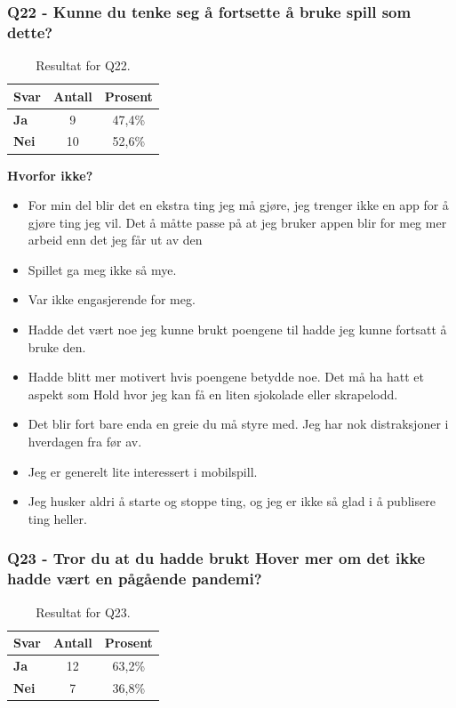 \subsubsection*{Q22 - Kunne du tenke seg å fortsette å bruke spill som dette?}
 \begin{table}[H]
    \centering
    \begin{tabularx}{0.4\textwidth}{|>{\bfseries}X|c|c|}
        \hline         \textbf{Svar}  & \textbf{Antall} & \textbf{Prosent}  \\  \hline
        Ja & 9 & 47,4\%  \\ 
        Nei & 10 & 52,6\% \\
         \hline
    \end{tabularx}
    \caption{Resultat for Q22.}
\end{table}

\textbf{Hvorfor ikke?} 
\begin{itemize}[noitemsep]
	\item For min del blir det en ekstra ting jeg må gjøre, jeg trenger ikke en app for å gjøre ting jeg vil. Det å måtte passe på at jeg bruker appen blir for meg mer arbeid enn det jeg får ut av den 
	\item Spillet ga meg ikke så mye.
	\item Var ikke engasjerende for meg.
	\item Hadde det vært noe jeg kunne brukt poengene til hadde jeg kunne fortsatt å bruke den.
	\item Hadde blitt mer motivert hvis poengene betydde noe. Det må ha hatt et aspekt som Hold hvor jeg kan få en liten sjokolade eller skrapelodd.
	\item Det blir fort bare enda en greie du må styre med. Jeg har nok distraksjoner i hverdagen fra før av.
	\item Jeg er generelt lite interessert i mobilspill.
	\item Jeg husker aldri å starte og stoppe ting, og jeg er ikke så glad i å publisere ting heller.
\end{itemize}

\subsubsection*{Q23 - Tror du at du hadde brukt Hover mer om det ikke hadde vært en pågående pandemi?}
 \begin{table}[H]
    \centering
    \begin{tabularx}{0.4\textwidth}{|>{\bfseries}X|c|c|}
        \hline         \textbf{Svar}  & \textbf{Antall} & \textbf{Prosent}  \\  \hline
        Ja & 12 & 63,2\%  \\ 
        Nei & 7 & 36,8\% \\
         \hline
    \end{tabularx}
    \caption{Resultat for Q23.}
\end{table}

